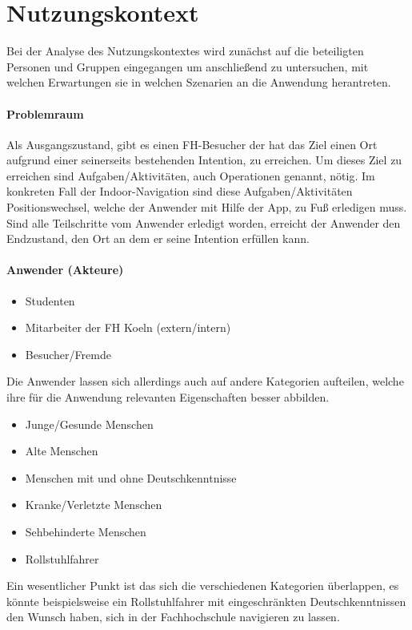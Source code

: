 \chapter{Nutzungskontext}
Bei der Analyse des Nutzungskontextes wird zunächst auf die beteiligten Personen und Gruppen eingegangen um anschließend zu untersuchen, mit welchen Erwartungen sie in welchen Szenarien an die Anwendung herantreten.

\subsubsection*{Problemraum}
Als Ausgangszustand, gibt es einen FH-Besucher der hat das Ziel einen Ort aufgrund einer seinerseits bestehenden Intention, zu erreichen. Um dieses Ziel zu erreichen sind Aufgaben/Aktivitäten, auch Operationen genannt, nötig. Im konkreten Fall der Indoor-Navigation sind diese Aufgaben/Aktivitäten Positionswechsel, welche der Anwender mit Hilfe der App, zu Fuß erledigen muss. Sind alle Teilschritte vom Anwender erledigt worden, erreicht der Anwender den Endzustand, den Ort an dem er seine Intention erfüllen kann.

\subsubsection*{Anwender (Akteure)}
\begin{itemize}
  \item Studenten
  \item Mitarbeiter der FH Koeln (extern/intern)
  \item Besucher/Fremde
\end{itemize}

\noindent
Die Anwender lassen sich allerdings auch auf andere Kategorien aufteilen, welche ihre für die Anwendung relevanten Eigenschaften besser abbilden.
\begin{itemize}
  \item Junge/Gesunde Menschen
  \item Alte Menschen
  \item Menschen mit und ohne Deutschkenntnisse
  \item Kranke/Verletzte Menschen
  \item Sehbehinderte Menschen
  \item Rollstuhlfahrer
\end{itemize}

\noindent
Ein wesentlicher Punkt ist das sich die verschiedenen Kategorien überlappen, es könnte beispielsweise ein Rollstuhlfahrer mit eingeschränkten Deutschkenntnissen den Wunsch haben, sich in der Fachhochschule navigieren zu lassen.

